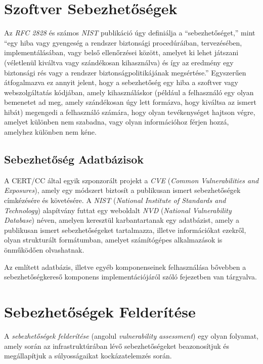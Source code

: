 \section*{Szoftver Sebezhetőségek}
	
	Az \textit{RFC 2828} és számos \textit{NIST} publikáció úgy definiálja a ``sebezhetőséget,'' mint ``egy hiba vagy gyengeség a rendszer biztonsági procedúráiban, tervezésében, implementálásában, vagy belső ellenőrzései között, amelyet ki lehet játszani (véletlenül kiváltva vagy szándékosan kihasználva) és így az eredmény egy biztonsági rés vagy a rendszer biztonságpolitikájának megsértése.''\cite{rfc2828,nist80030} Egyszerűen átfogalmazva ez annyit jelent, hogy a sebezhetőség egy hiba a szoftver vagy webszolgáltatás kódjában, amely kihasználáskor (például a felhasználó egy olyan bemenetet ad meg, amely szándékosan úgy lett formázva, hogy kiváltsa az ismert hibát) megengedi a felhasználó számára, hogy olyan tevékenységet hajtson végre, amelyet különben nem szabadna, vagy olyan információhoz férjen hozzá, amelyhez különben nem kéne.
	
\subsection*{Sebezhetőség Adatbázisok} \label{ssec:vulndbs}
	
	A CERT/CC által egyik szponzorált projekt a \textit{CVE} (\textit{Common Vulnerabilities and Exposures}), amely egy módszert biztosít a publikusan ismert sebezhetőségek címkézésére és követésére. A \textit{NIST} (\textit{National Institute of Standards and Technology}) alapítvány futtat egy weboldalt \textit{NVD} (\textit{National Vulnerability Database}) néven, amelyen keresztül karbantartanak egy adatbázist, amely a publikusan ismert sebezhetőségeket tartalmazza, illetve információkat ezekről, olyan strukturált formátumban, amelyet számítógépes alkalmazások is önműködően olvashatnak\cite{nvd15}.
	
	Az említett adatbázis, illetve egyéb komponenseinek felhasználása bővebben a sebezhetőségkereső komponens implementációjáról szóló fejezetben van tárgyalva.
	
\section*{Sebezhetőségek Felderítése}
	
	A \textit{sebezhetőségek felderítése} (angolul \textit{vulnerability assessment}) egy olyan folyamat, amely során az infrastruktúrában lévő sebezhetőségeket beazonosítjuk és megállapítjuk a súlyosságaikat kockázatelemzés során.
	
